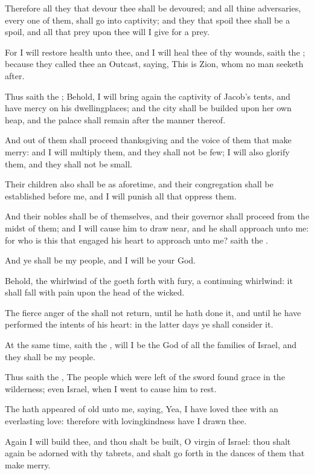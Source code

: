 \Verse Therefore all they that devour thee shall be devoured; and all thine adversaries, every one of them, shall go into captivity; and they that spoil thee shall be a spoil, and all that prey upon thee will I give for a prey.

\Verse For I will restore health unto thee, and I will heal thee of thy wounds, saith the \LORD; because they called thee an Outcast, saying, This is Zion, whom no man seeketh after.

\Verse Thus saith the \LORD; Behold, I will bring again the captivity of Jacob's tents, and have mercy on his dwellingplaces; and the city shall be builded upon her own heap, and the palace shall remain after the manner thereof.

\Verse And out of them shall proceed thanksgiving and the voice of them that make merry: and I will multiply them, and they shall not be few; I will also glorify them, and they shall not be small.

\Verse Their children also shall be as aforetime, and their congregation shall be established before me, and I will punish all that oppress them.

\Verse And their nobles shall be of themselves, and their governor shall proceed from the midst of them; and I will cause him to draw near, and he shall approach unto me: for who is this that engaged his heart to approach unto me? saith the \LORD.

\Verse And ye shall be my people, and I will be your God.

\Verse Behold, the whirlwind of the \LORD goeth forth with fury, a continuing whirlwind: it shall fall with pain upon the head of the wicked.

\Verse The fierce anger of the \LORD shall not return, until he hath done it, and until he have performed the intents of his heart: in the latter days ye shall consider it.


\Chapter
\Verse At the same time, saith the \LORD, will I be the God of all the families of Israel, and they shall be my people.

\Verse Thus saith the \LORD, The people which were left of the sword found grace in the wilderness; even Israel, when I went to cause him to rest.

\Verse The \LORD hath appeared of old unto me, saying, Yea, I have loved thee with an everlasting love: therefore with lovingkindness have I drawn thee.

\Verse Again I will build thee, and thou shalt be built, O virgin of Israel: thou shalt again be adorned with thy tabrets, and shalt go forth in the dances of them that make merry.

